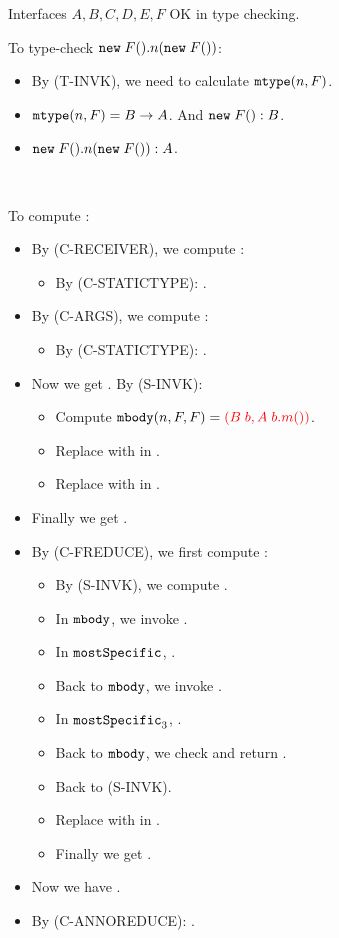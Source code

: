 Interfaces $A,B,C,D,E,F$ OK in type checking.

To type-check $\texttt{new} \; F().n(\texttt{new} \; F())$:
\begin{itemize}
	\item By (T-INVK), we need to calculate $\texttt{mtype}(n, F)$.
	\item $\texttt{mtype}(n, F) = B \to A$. And $\texttt{new} \; F() : B$.
	\item $\texttt{new} \; F().n(\texttt{new} \; F()) : A$.
\end{itemize}

~

To compute :
\begin{itemize}
	\item By (C-RECEIVER), we compute :
	\begin{itemize}
		\item By (C-STATICTYPE): .
	\end{itemize}
	\item By (C-ARGS), we compute :
	\begin{itemize}
		\item By (C-STATICTYPE): .
	\end{itemize}
	\item Now we get . By (S-INVK):
	\begin{itemize}
		\item Compute $\texttt{mbody}(n, F, F) = \textcolor{red}{(B \; b, A \; b.m())}$.
		\item Replace  with  in .
		\item Replace \red{$\kwthis$} with  in .
	\end{itemize}
	\item Finally we get .
	\item By (C-FREDUCE), we first compute :
	\begin{itemize}
		\item By (S-INVK), we compute .
		\item In $\texttt{mbody}$, we invoke .
		\item In $\texttt{mostSpecific}$, .
		\item Back to $\texttt{mbody}$, we invoke .
		\item In $\texttt{mostSpecific}_3$, .
		\item Back to $\texttt{mbody}$, we check  and return .
		\item Back to (S-INVK).
		\item Replace \red{$\kwthis$} with  in .
		\item Finally we get .
	\end{itemize}
	\item Now we have .
	\item By (C-ANNOREDUCE): .
\end{itemize}

